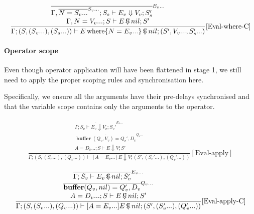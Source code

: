 \documentclass{scrartcl}
\DeclareMathOperator{\where}{where}
\DeclareMathOperator{\ceval}{\overset{C}{\smash{\Downarrow}}}
\DeclareMathOperator{\buffer}{\mathbf{buffer}}
\begin{document}
    \begin{align*}
    \frac{
        \begin{matrix}
        \overline{\Gamma, \overline{N=S_v...}^{S_v...}; S_s \vdash E_v \Downarrow V_v; S_s'}^{E_v...} \\
        \Gamma, N=V_v...; S \vdash E \ceval nil; S' \\
        \end{matrix}
    }{
        \Gamma; (S, (S_v...), (S_s...)) \vdash E \where \{ N=E_v... \} \ceval nil; (S', V_v..., S_s'...)
    }[\text{Eval-where-C}]
    \end{align*}
    
    \paragraph{Operator scope}
    
    Even though operator application will have been flattened in stage 1, we still need to apply the proper scoping rules and synchronisation here.
    
    Specifically, we ensure all the arguments have their pre-delays synchronised and that the variable scope contains only the arguments to the operator.
    
    \begin{align*}
    \frac{
        \begin{matrix}
        \overline{\Gamma; S_v \vdash E_v \Downarrow V_v; S_v'}^{E_v...} \\
        \overline{\buffer(Q_v, V_v) = Q_v', D_v}^{Q_v...} \\
        A = D_v...; S \vdash E \Downarrow V; S'
        \end{matrix}
    }{
        \Gamma; (S, (S_v...), (Q_v...)) \vdash [A=E_v...]E \Downarrow V; (S', (S_v'...), (Q_v'...))
    }[\text{Eval-apply}]
    \end{align*}
    
    \begin{align*}
    \frac{
        \begin{matrix}
        \overline{\Gamma; S_v \vdash E_v \ceval nil; S_v'}^{E_v...} \\
        \overline{\buffer(Q_v, nil) = Q_v', D_v}^{Q_v...} \\
        A = D_v...; S \vdash E \ceval nil; S'
        \end{matrix}
    }{
        \Gamma; (S, (S_v...), (Q_v...)) \vdash [A=E_v...]E \ceval nil; (S', (S_v'...), (Q_v'...))
    }[\text{Eval-apply-C}]
    \end{align*}
    
\end{document}
